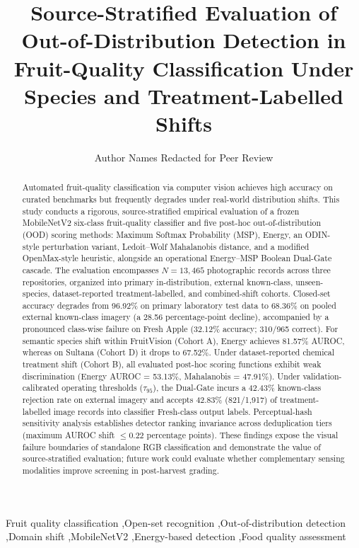 \documentclass[3p,times,procedia]{elsarticle}
\begin{document}
\begin{frontmatter}


\title{Source-Stratified Evaluation of Out-of-Distribution Detection in Fruit-Quality Classification Under Species and Treatment-Labelled Shifts}

\author[a]{Author Names Redacted for Peer Review}
\address[a]{Affiliation Details Redacted for Double-Blind Peer Review}

\begin{abstract}
Automated fruit-quality classification via computer vision achieves high accuracy on curated benchmarks but frequently degrades under real-world distribution shifts. This study conducts a rigorous, source-stratified empirical evaluation of a frozen MobileNetV2 six-class fruit-quality classifier and five post-hoc out-of-distribution (OOD) scoring methods: Maximum Softmax Probability (MSP), Energy, an ODIN-style perturbation variant, Ledoit--Wolf Mahalanobis distance, and a modified OpenMax-style heuristic, alongside an operational Energy--MSP Boolean Dual-Gate cascade. The evaluation encompasses $N = 13,465$ photographic records across three repositories, organized into primary in-distribution, external known-class, unseen-species, dataset-reported treatment-labelled, and combined-shift cohorts. Closed-set accuracy degrades from 96.92\% on primary laboratory test data to 68.36\% on pooled external known-class imagery (a 28.56 percentage-point decline), accompanied by a pronounced class-wise failure on Fresh Apple (32.12\% accuracy; 310/965 correct). For semantic species shift within FruitVision (Cohort A), Energy achieves 81.57\% AUROC, whereas on Sultana (Cohort D) it drops to 67.52\%. Under dataset-reported chemical treatment shift (Cohort B), all evaluated post-hoc scoring functions exhibit weak discrimination (Energy AUROC = 53.13\%, Mahalanobis = 47.91\%). Under validation-calibrated operating thresholds ($\tau_{95}$), the Dual-Gate incurs a 42.43\% known-class rejection rate on external imagery and accepts 42.83\% (821/1,917) of treatment-labelled image records into classifier Fresh-class output labels. Perceptual-hash sensitivity analysis establishes detector ranking invariance across deduplication tiers (maximum AUROC shift $\le 0.22$ percentage points). These findings expose the visual failure boundaries of standalone RGB classification and demonstrate the value of source-stratified evaluation; future work could evaluate whether complementary sensing modalities improve screening in post-harvest grading.
\end{abstract}

\begin{keyword}
Fruit quality classification \sep Open-set recognition \sep Out-of-distribution detection \sep Domain shift \sep MobileNetV2 \sep Energy-based detection \sep Food quality assessment
\end{keyword}


\end{frontmatter}
\end{document}
